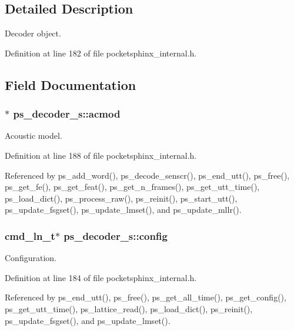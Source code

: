 \subsection{Detailed Description}
Decoder object. 

Definition at line 182 of file pocketsphinx\-\_\-internal.\-h.



\subsection{Field Documentation}
\subsubsection[{acmod}]{$\ast$ ps\-\_\-decoder\-\_\-s\-::acmod}\label{structps__decoder__s_af834d2bc1d44c1d9ef607b025413a0b8}


Acoustic model. 



Definition at line 188 of file pocketsphinx\-\_\-internal.\-h.



Referenced by ps\-\_\-add\-\_\-word(), ps\-\_\-decode\-\_\-senscr(), ps\-\_\-end\-\_\-utt(), ps\-\_\-free(), ps\-\_\-get\-\_\-fe(), ps\-\_\-get\-\_\-feat(), ps\-\_\-get\-\_\-n\-\_\-frames(), ps\-\_\-get\-\_\-utt\-\_\-time(), ps\-\_\-load\-\_\-dict(), ps\-\_\-process\-\_\-raw(), ps\-\_\-reinit(), ps\-\_\-start\-\_\-utt(), ps\-\_\-update\-\_\-fsgset(), ps\-\_\-update\-\_\-lmset(), and ps\-\_\-update\-\_\-mllr().

\subsubsection[{config}]{\setlength{\rightskip}{0pt plus 5cm}cmd\-\_\-ln\-\_\-t$\ast$ ps\-\_\-decoder\-\_\-s\-::config}\label{structps__decoder__s_a0565ed97b32408bd05c8104f020cef05}


Configuration. 



Definition at line 184 of file pocketsphinx\-\_\-internal.\-h.



Referenced by ps\-\_\-end\-\_\-utt(), ps\-\_\-free(), ps\-\_\-get\-\_\-all\-\_\-time(), ps\-\_\-get\-\_\-config(), ps\-\_\-get\-\_\-utt\-\_\-time(), ps\-\_\-lattice\-\_\-read(), ps\-\_\-load\-\_\-dict(), ps\-\_\-reinit(), ps\-\_\-update\-\_\-fsgset(), and ps\-\_\-update\-\_\-lmset().

